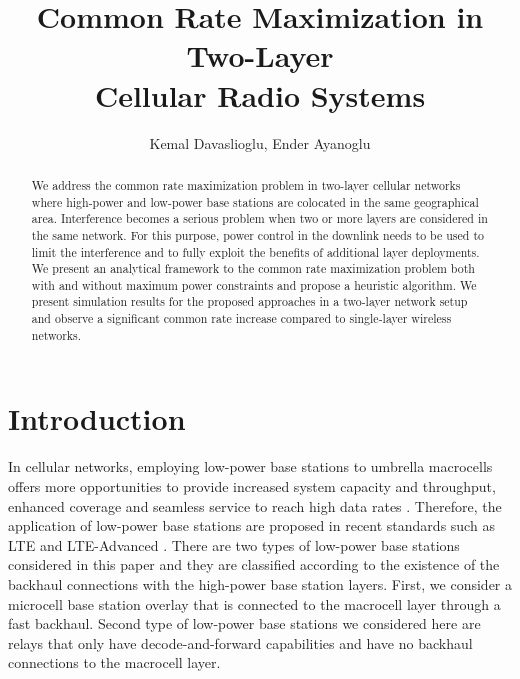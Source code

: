 \documentclass[conference,letterpaper,final,10pt]{IEEEtran}
\begin{document}
\title{Common Rate Maximization in Two-Layer\\Cellular Radio Systems}
\author{
}\maketitle
\author{Kemal Davaslioglu, Ender Ayanoglu}\maketitle
\begin{abstract}
We address the common rate maximization problem in two-layer cellular networks where high-power and low-power base stations are colocated in the same geographical area. Interference becomes a serious problem when two or more layers are considered in the same network. For this purpose, power control in the downlink needs to be used to limit the interference and to fully exploit the benefits of additional layer deployments. We present an analytical framework to the common rate maximization problem both with and without maximum power constraints and propose a heuristic algorithm. We present simulation results for the proposed approaches in a two-layer network setup and observe a significant common rate increase compared to single-layer wireless networks.
\end{abstract}

\section{Introduction}
In cellular networks, employing low-power base stations to umbrella macrocells offers more opportunities to provide increased system capacity and throughput, enhanced coverage and seamless service to reach high data rates \cite{Rappaport}. Therefore, the application of low-power base stations are proposed in recent standards such as LTE and LTE-Advanced \cite{ReleaseNine,ReleaseTen}. There are two types of low-power base stations considered in this paper and they are classified according to the existence of the backhaul connections with the high-power base station layers. First, we consider a microcell base station overlay that is connected to the macrocell layer through a fast backhaul. Second type of low-power base stations we considered here are relays that only have decode-and-forward capabilities and have no backhaul connections to the macrocell layer.
\end{document}
